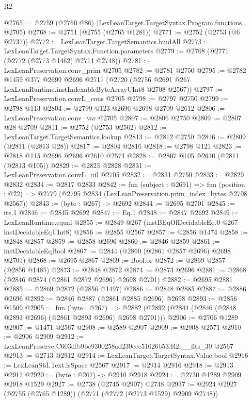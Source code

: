 \begin{lexlean}{R2}
\begin{coremodule}
@2765 := @2759 (@2760 @86) (LexLeanTarget.TargetSyntax.Program.functions @2705)
@2768 := @2751 (@2755 (@2765 @1281))
@2771 := @2752 (@2753 (@6 @2737))
@2772 := LexLeanTarget.TargetSemantics.bindAll
@2773 := LexLeanTarget.TargetSyntax.Function.parameters
@2779 := @2768 (@2771 (@2772 (@2773 @1462) @2711 @2748))
@2781 := LexLeanPreservation.conv_prim @2705
@2782 := @2781 @2750
@2795 := @2782
    @1459
    @377
    @2699
    @2696
    @2711
    (@2720 (@2756 @2691 @267 LexLeanRuntime.instIndexableByteArrayUInt8 @2708 @2567))
@2797 := LexLeanPreservation.convL_cons @2705
@2798 := @2797 @2750
@2799 := @2798 @113
@2804 := @2799 @123 @2696 @2698 @2709 @2612
@2806 := LexLeanPreservation.conv_var @2705
@2807 := @2806 @2750
@2809 := @2807 @28 @2709
@2811 := @2752 (@2753 @2562)
@2812 := LexLeanTarget.TargetSemantics.lookup
@2813 := @2812 @2750
@2816 := @2809 (@2811 (@2813 @28))
@2817 := @2804 @2816
@2818 := @2798 @121
@2823 := @2818 @115 @2696 @2696 @2610 @2571
@2828 := @2807 @105 @2610 (@2811 (@2813 @105))
@2829 := @2823 @2828
@2831 := LexLeanPreservation.convL_nil @2705
@2832 := @2831 @2750
@2833 := @2829 @2832
@2834 := @2817 @2833
@2842 := fun (subject : @2691) =>
  fun (position : @22) => @2779 (@2795 @2834 (LexLeanPreservation.prim_index_bytes @2708 @2567))
@2843 := (byte : @267) -> @2692
@2844 := @2695 @2701
@2845 := ite.{1}
@2846 := @2845 @2692
@2847 := Eq.{1}
@2848 := @2847 @2692
@2849 := LexLeanRuntime.equal
@2855 := @2849 @267 (instBEqOfDecidableEq.{0} @267 instDecidableEqUInt8)
@2856 := @2855 @2567
@2857 := @2856 @1474
@2858 := @2848 @2857
@2859 := @2858 @2696
@2860 := @2846 @2859
@2861 := instDecidableEqBool
@2867 := @2844 (@2860 (@2861 @2857 @2696) @2698 @2701)
@2868 := @2695 @2867
@2869 := Bool.or
@2872 := @2869 @2857 (@2856 @1485)
@2873 := @2848 @2872
@2874 := @2873 @2696
@2881 := @2868 (@2846 @2874 (@2861 @2872 @2696) @2698 @2701)
@2882 := @2695 @2881
@2885 := @2869 @2872 (@2856 @1497)
@2886 := @2848 @2885
@2887 := @2886 @2696
@2892 := @2846 @2887 (@2861 @2885 @2696) @2698
@2893 := @2856 @1509
@2905 := fun (byte : @267) =>
  @2882 (@2892 (@2844 (@2846 (@2848 @2893 @2696) (@2861 @2893 @2696) @2698 @2701)))
@2906 := @2706 @1289
@2907 := @1471 @2567
@2908 := @2589 @2907
@2909 := @2908 @2571
@2910 := @2906 @2909
@2912 := LexLeanPreserve.C603dfb9be9300258ad239ccc51626b53.R2.__fits_39 @2567
@2913 := @2713 @2912
@2914 := LexLeanTarget.TargetSyntax.Value.bool
@2916 := LexLeanStd.Text.isSpace @2567
@2917 := @2914 @2916
@2918 := @2913 @2917
@2920 := (byte : @267) -> @2910 @2918
@2924 := @2730 @1289 @2909 @2918 @1529
@2927 := @2738 (@2745 @2907) @2748
@2937 := @2924 @2927 (@2755 (@2765 @1289)) (@2771 (@2772 (@2773 @1529) @2909 @2748))

\end{coremodule}
\end{lexlean}

